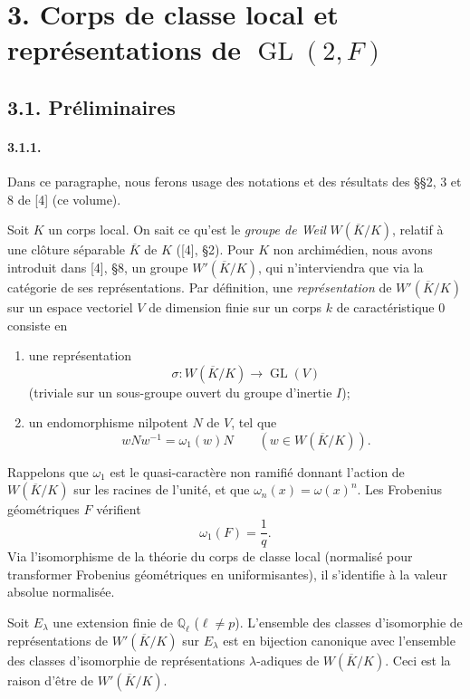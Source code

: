 \documentclass[10pt,a4paper]{article}
\providecommand{\GL}{\operatorname{GL}}
\providecommand{\Q}{\mathbb Q}
\begin{document}
\section*{3. Corps de classe local et représentations de \(\GL(2,F)\)}

\subsection*{3.1. Préliminaires}

\paragraph{3.1.1.} Dans ce paragraphe, nous ferons usage des notations et des résultats des §§2, 3 et 8 de [4] (ce volume).

Soit \(K\) un corps local. On sait ce qu'est le \emph{groupe de Weil} \(W(\overline K/K)\), relatif à une clôture séparable \(\overline K\) de \(K\) ([4], §2). Pour \(K\) non archimédien, nous avons introduit dans [4], §8, un \textquotedbl groupe\textquotedbl{} \(W'(\overline K/K)\), qui n'interviendra que via la catégorie de ses représentations. Par définition, une \emph{représentation} de \(W'(\overline K/K)\) sur un espace vectoriel \(V\) de dimension finie sur un corps \(k\) de caractéristique \(0\) consiste en
\begin{enumerate}[label=(\alph*)]
\item une représentation
\[
\sigma:W(\overline K/K)\longrightarrow\GL(V)
\]
(triviale sur un sous-groupe ouvert du groupe d'inertie \(I\));
\item un endomorphisme nilpotent \(N\) de \(V\), tel que
\[
wNw^{-1}=\omega_1(w)N\qquad(w\in W(\overline K/K)).
\]
\end{enumerate}
Rappelons que \(\omega_1\) est le quasi-caractère non ramifié donnant l'action de \(W(\overline K/K)\) sur les racines de l'unité, et que \(\omega_n(x)=\omega(x)^n\). Les Frobenius géométriques \(F\) vérifient
\[
\omega_1(F)=\frac1q.
\]
Via l'isomorphisme de la théorie du corps de classe local (normalisé pour transformer Frobenius géométriques en uniformisantes), il s'identifie à la valeur absolue normalisée.

Soit \(E_\lambda\) une extension finie de \(\Q_\ell\) (\(\ell\ne p\)). L'ensemble des classes d'isomorphie de représentations de \(W'(\overline K/K)\) sur \(E_\lambda\) est en bijection canonique avec l'ensemble des classes d'isomorphie de représentations \(\lambda\)-adiques de \(W(\overline K/K)\). Ceci est la raison d'être de \(W'(\overline K/K)\).
\end{document}
